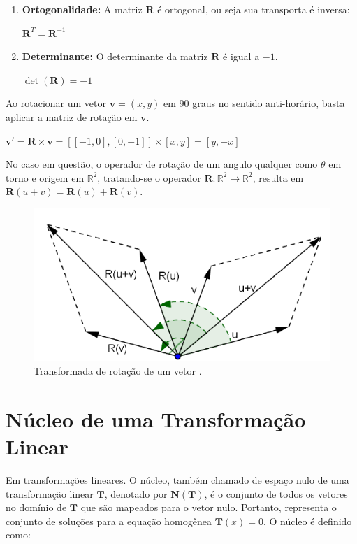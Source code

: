 \begin{enumerate}
	\item \textbf{Ortogonalidade:} A matriz $\mathbf{R}$ é ortogonal, ou seja sua transporta é inversa:
	
	\centerline{$\mathbf{R}^T = \mathbf{R}^{-1}$}
	\item \textbf{Determinante:} O determinante da matriz $\mathbf{R}$ é igual a $-1$.
	
	\centerline{$\det(\mathbf{R}) = -1$}
\end{enumerate}

Ao rotacionar um vetor $\mathbf{v} = (x, y)$ em 90 graus  no sentido anti-horário, basta aplicar a matriz de rotação em $\mathbf{v}$.

\centerline{$\mathbf{v}' = \mathbf{R} \times \mathbf{v} = [[-1, 0], [0, -1]] \times [x, y] = [y, -x]$}

No caso em questão, o operador de rotação de um angulo qualquer como $\theta$ em torno e origem em $\mathbb{R}^2$, tratando-se o operador $\mathbf{R}: \mathbb{R}^2 \longrightarrow \mathbb{R}^2$, resulta em $\mathbf{R}(u + v) = \mathbf{R}(u) + \mathbf{R}(v)$.

\begin{figure}[H]
	\centering
	\includegraphics[scale=0.90]{t_rotacao.png}
	\caption{Transformada de rotação de um vetor \cite{nogueira2013}.}
\end{figure}

\section{Núcleo de uma Transformação Linear}
Em transformações lineares. O núcleo, também chamado de espaço nulo de uma transformação linear $\mathbf{T}$, denotado por  $\mathbf{N}(\mathbf{T})$, é o conjunto de todos os vetores no domínio de $\mathbf{T}$ que são mapeados para o vetor nulo. Portanto, representa o conjunto de soluções para a equação homogênea $\mathbf{T}(x) = 0$. O núcleo é definido como:

